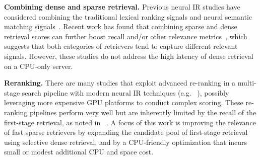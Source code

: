 \textbf{Combining  dense and sparse retrieval.}
Previous neural IR studies  have  considered combining the traditional lexical ranking signals and neural semantic matching signals~\cite{Mitra2017LearningTM,Shao2019PrivacyawareDR,Gao2020ComplementingLR,Luan2020SparseDA,Yang2021WSDM-BECR}. 
Recent work has found that combining  sparse and dense retrieval scores  
can further boost recall and/or other relevance metrics~\cite{Lin2021unicoil,2022LinearInterpolationJimLin, kuzi2020leveraging}, which
suggests  that both categories  of retrievers tend to capture  different relevant signals. However, these studies do not address the high  latency  of
dense retrieval on a CPU-only server.
%

\textbf{Reranking.}
There  are many studies that exploit advanced re-ranking in a multi-stage search pipeline with modern
neural IR techniques (e.g. ~\cite{MacAvaney2019SIGIR-cedr, MacAvaney2020SIGIR-prettr, 2023SIGIR-ZhuangRankT5,Yang2022CQ,Zhuang2021TILDEv2,2022WWWforwardIndex}),
possibly leveraging more expensive GPU platforms to conduct complex scoring.
These  re-ranking pipelines perform very well but are inherently limited by the recall of the first-stage retrieval,
as noted in  ~\cite{2022CIKM-MacAvaneyGraphReRank, 2023SIGIR-LADR}. 
A focus of this work is improving the relevance of fast sparse retrievers by expanding the candidate pool of first-stage retrieval using 
selective dense retrieval, and by a CPU-friendly optimization that incurs small or modest additional CPU and space cost.

